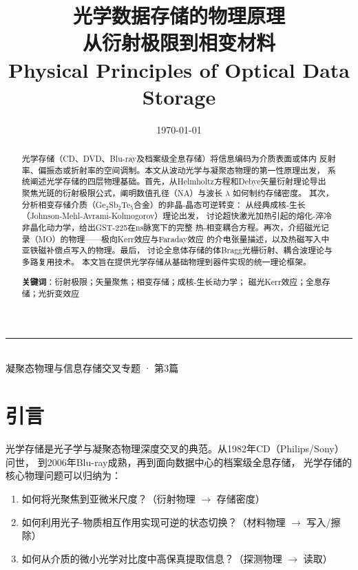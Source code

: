 \documentclass[11pt,a4paper,twoside]{article}
\theoremstyle{definition}\newtheorem{definition}{定义}[section]
\theoremstyle{plain}\newtheorem{theorem}{定理}[section]
\theoremstyle{remark}\newtheorem{remark}{注解}[section]
\begin{document}
\title{{\Huge\bfseries 光学数据存储的物理原理}\\[8pt]
       {\Large 从衍射极限到相变材料}\\[12pt]
       {\normalsize Physical Principles of Optical Data Storage}}
\author{}\date{\today}
\maketitle

\begin{center}\rule{0.8\textwidth}{0.5pt}\\[8pt]
{\small 凝聚态物理与信息存储交叉专题 · 第3篇}\\[4pt]
\end{center}

\begin{abstract}
\noindent
光学存储（CD、DVD、Blu-ray及档案级全息存储）将信息编码为介质表面或体内
反射率、偏振态或折射率的空间调制。本文从波动光学与凝聚态物理的第一性原理出发，
系统阐述光学存储的四层物理基础。首先，从Helmholtz方程和Debye矢量衍射理论导出
聚焦光斑的衍射极限公式，阐明数值孔径（NA）与波长 $\lambda$ 如何制约存储密度。
其次，分析相变存储介质（Ge$_2$Sb$_2$Te$_5$合金）的非晶-晶态可逆转变：
从经典成核-生长（Johnson-Mehl-Avrami-Kolmogorov）理论出发，
讨论超快激光加热引起的熔化-淬冷非晶化动力学，给出GST-225在ns脉宽下的完整
热-相变耦合方程。再次，介绍磁光记录（MO）的物理——极向Kerr效应与Faraday效应
的介电张量描述，以及热磁写入中亚铁磁补偿点写入的物理。最后，
讨论全息体存储的体Bragg光栅衍射、耦合波理论与多路复用技术。
本文旨在提供光学存储从基础物理到器件实现的统一理论框架。

\medskip
\noindent\textbf{关键词}：衍射极限；矢量聚焦；相变存储；成核-生长动力学；
磁光Kerr效应；全息存储；光折变效应
\end{abstract}

\tableofcontents\newpage

\section{引言}

光学存储是光子学与凝聚态物理深度交叉的典范。从1982年CD（Philips/Sony）问世，
到2006年Blu-ray成熟，再到面向数据中心的档案级全息存储，
光学存储的核心物理问题可以归纳为：
\begin{enumerate}
  \item 如何将光聚焦到亚微米尺度？\quad（衍射物理 $\to$ 存储密度）
  \item 如何利用光子-物质相互作用实现可逆的状态切换？\quad（材料物理 $\to$ 写入/擦除）
  \item 如何从介质的微小光学对比度中高保真提取信息？\quad（探测物理 $\to$ 读取）
\end{enumerate}
\end{document}
